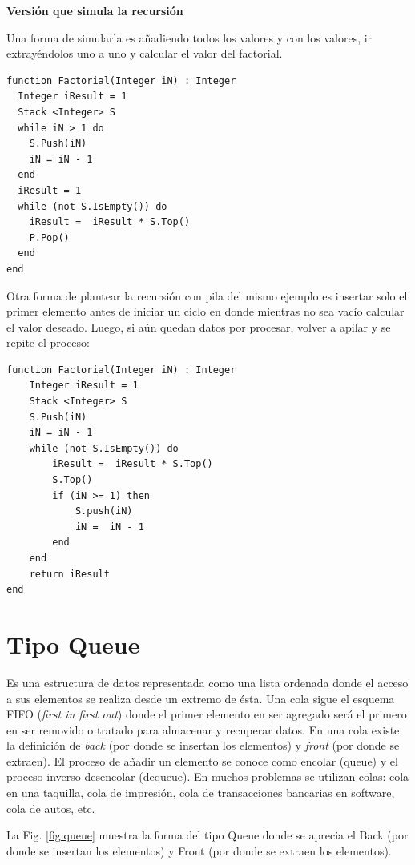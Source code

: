 \textbf{Versión que simula la recursión}

Una forma de simularla es añadiendo todos los valores y con los valores, ir extrayéndolos uno a uno y calcular el valor del factorial.

\begin{lstlisting}[upquote=true, language=pseudo]
function Factorial(Integer iN) : Integer
  Integer iResult = 1
  Stack <Integer> S
  while iN > 1 do
    S.Push(iN)
    iN = iN - 1
  end
  iResult = 1
  while (not S.IsEmpty()) do
    iResult =  iResult * S.Top()
    P.Pop()
  end
end
\end{lstlisting}

Otra forma de plantear la recursión con pila del mismo ejemplo es insertar solo el primer elemento antes de iniciar un ciclo en donde mientras no sea vacío calcular el valor deseado. Luego, si aún quedan datos por procesar, volver a apilar y se repite el proceso:

\begin{lstlisting}[upquote=true, language=pseudo]
function Factorial(Integer iN) : Integer
    Integer iResult = 1
    Stack <Integer> S
    S.Push(iN)
    iN = iN - 1
    while (not S.IsEmpty()) do
        iResult =  iResult * S.Top()
        S.Top()
        if (iN >= 1) then
            S.push(iN)
            iN =  iN - 1
        end
    end
    return iResult
end
\end{lstlisting}

\section{Tipo Queue}

Es una estructura de datos representada como una lista ordenada donde el acceso a sus elementos se realiza desde un extremo de ésta. Una cola sigue el esquema FIFO (\textit{first in first out}) donde el primer elemento en ser agregado será el primero en ser removido o tratado para almacenar y recuperar datos. En una cola existe la definición de \textit{back} (por donde se insertan los elementos) y \textit{front} (por donde se extraen). El proceso de añadir un elemento se conoce como encolar (queue) y el proceso inverso desencolar (dequeue). En muchos problemas se utilizan colas: cola en una taquilla, cola de impresión, cola de transacciones bancarias en software, cola de autos, etc.

La Fig. \ref{fig:queue} muestra la forma del tipo Queue donde se aprecia el Back (por donde se insertan los elementos) y Front (por donde se extraen los elementos).

